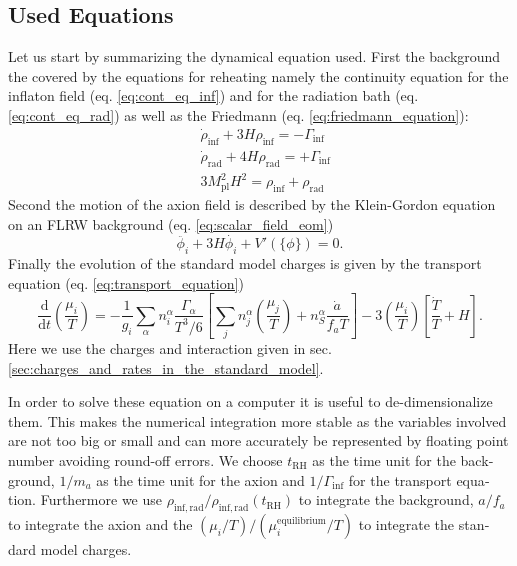 \documentclass[master,       %
               twoside,        %
               BCOR10mm,       %
               english,ngerman, %
               ]{GAUBM}
\begin{document}
\begin{otherlanguage}{english}
\section{Used Equations}
Let us start by summarizing the dynamical equation used.
First the background the covered by the equations for reheating namely the continuity equation for the inflaton field (eq. \eqref{eq:cont_eq_inf}) and for the radiation bath (eq. \eqref{eq:cont_eq_rad}) as well as the Friedmann (eq. \eqref{eq:friedmann_equation}):
\begin{align}
	&\dot{\rho}_\mathrm{inf} + 3 H \rho_\mathrm{inf} = - \Gamma_\mathrm{inf} \nonumber \\
	&\dot{\rho}_\mathrm{rad} + 4 H \rho_\mathrm{rad} = + \Gamma_\mathrm{inf} \nonumber \\
	& 3 M_\mathrm{pl}^2 H^2 = \rho_\mathrm{inf} + \rho_\mathrm{rad}
\end{align}
Second the motion of the axion field is described by the Klein-Gordon equation on an FLRW background (eq. \eqref{eq:scalar_field_eom})
\begin{equation}
	\ddot{\phi_i} + 3 H \dot{\phi_i} + V'(\{\phi\}) = 0.
\end{equation}
Finally the evolution of the standard model charges is given by the transport equation (eq. \eqref{eq:transport_equation})
\begin{equation}
	\frac{\mathrm{d}}{\mathrm{d} t} \left( \frac{\mu_i}{T} \right) = - \frac{1}{g_i} \sum_\alpha n^\alpha_i \frac{\Gamma_\alpha}{T^3 / 6} \left[ \sum_j n_j^\alpha \left( \frac{\mu_j}{T} \right) + n_S^\alpha \frac{\dot{a}}{f_a T} \right] - 3 \left( \frac{\mu_i}{T} \right) \left[ \frac{\dot{T}}{T} + H \right].
\end{equation}
Here we use the charges and interaction given in sec. \ref{sec:charges_and_rates_in_the_standard_model}.

In order to solve these equation on a computer it is useful to de-dimensionalize them.
This makes the numerical integration more stable as the variables involved are not too big or small and can more accurately be represented by floating point number avoiding round-off errors.
We choose $t_\mathrm{RH}$ as the time unit for the background, $1 / m_a$ as the time unit for the axion and $1 / \Gamma_\mathrm{inf}$ for the transport equation.
Furthermore we use $\rho_{\mathrm{inf}, \mathrm{rad}} / \rho_{\mathrm{inf}, \mathrm{rad}}(t_\mathrm{RH})$ to integrate the background, $a / f_a$ to integrate the axion and the $(\mu_i / T) / (\mu_i^\mathrm{equilibrium} / T)$ to integrate the standard model charges.


\end{otherlanguage}
\end{document}
